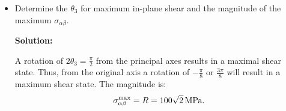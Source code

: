 \documentclass[12pt]{article}
\begin{document}
\begin{itemize}
	\item Determine the $\theta_3$ for maximum in-plane shear and the magnitude of the maximum $\sigma_{\alpha\beta}$.

	      \textbf{Solution:}

	      A rotation of $2 \theta_3 = \frac{\pi}{2}$
	      from the principal axes results in a maximal shear state. Thus, from the original
	      axis a rotation of $-\frac{ \pi }{ 8 }$ or $\frac{ 3\pi }{ 8 }$ will result in a maximum shear state.
	      The magnitude is:
	      \begin{equation}
		      \sigma_{\alpha\beta}^\text{max} = R = \SI[parse-numbers = false, number-math-rm = \ensuremath]{100 \sqrt{2}}{\mega\pascal}.
	      \end{equation}
\end{itemize}
\end{document}
